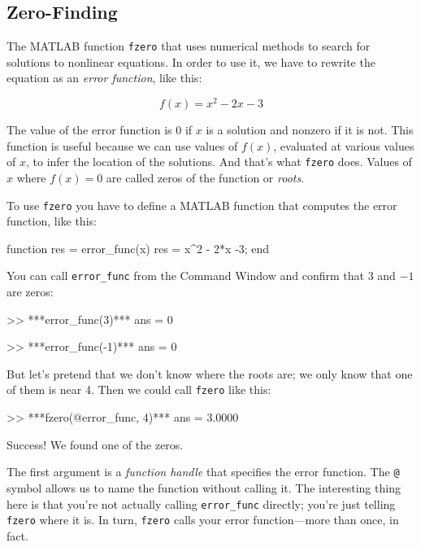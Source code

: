 \subsection{Zero-Finding}
\label{zero}


The MATLAB function \lstinline{fzero} that uses numerical methods to search for solutions to nonlinear equations.  In order to use it, we have to rewrite the equation as an \emph{error function}, like this:

\begin{equation*}
f(x) = x^2 - 2x -3
\end{equation*}

The value of the error function is 0 if $x$ is a solution and nonzero if it is not.
This function is useful because we can use values of $f(x)$, evaluated at various values of $x$, to infer the location of the solutions.  And that's what \lstinline{fzero} does.
Values of $x$ where $f(x) = 0$ are called zeros of the function or \emph{roots}.


To use \lstinline{fzero} you have to define a MATLAB function that computes the error function, like this:

\begin{code}
function res = error_func(x)
    res = x^2 - 2*x -3;
end
\end{code}

You can call \lstinline{error_func} from the Command Window and confirm that $3$ and $-1$ are zeros:

\begin{code}
>> ***error_func(3)***
ans = 0

>> ***error_func(-1)***
ans = 0
\end{code}

But let's pretend that we don't know where the roots are; we only know that one of them is near 4.  Then we could call \lstinline{fzero} like this:

\begin{code}
>> ***fzero(@error_func, 4)***
ans = 3.0000
\end{code}

Success!  We found one of the zeros.

The first argument is a \emph{function handle} that specifies
the error function.  The \lstinline{@} symbol allows us to name the
function without calling it.  The interesting thing here is
that you're not actually calling \lstinline{error_func} directly;
you're just telling \lstinline{fzero} where it is.  In turn, \lstinline{fzero}
calls your error function---more than once, in fact.

